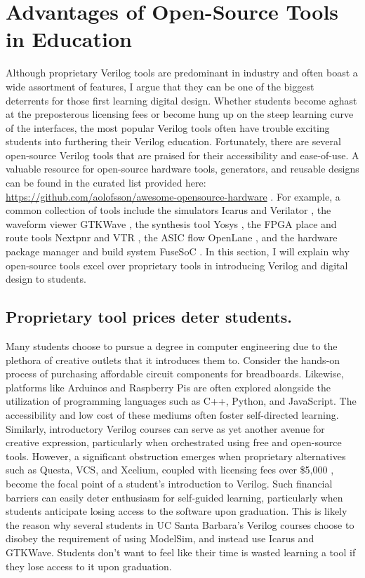 
\chapter{Advantages of Open-Source Tools in Education}
\label{chapter:open_source_tools}

Although proprietary Verilog tools are predominant in industry and often boast a wide assortment of features, I argue that they can be one of the biggest deterrents for those first learning digital design. Whether students become aghast at the preposterous licensing fees or become hung up on the steep learning curve of the interfaces, the most popular Verilog tools often have trouble exciting students into furthering their Verilog education. Fortunately, there are several open-source Verilog tools that are praised for their accessibility and ease-of-use. A valuable resource for open-source hardware tools, generators, and reusable designs can be found in the curated list provided here: \url{https://github.com/aolofsson/awesome-opensource-hardware} \cite{awesomeOpenSourceHardware}. For example, a common collection of tools include the simulators Icarus \cite{icarusGitHub} and Verilator \cite{verilatorGitHub}, the waveform viewer GTKWave \cite{gtkwaveGitHub}, the synthesis tool Yosys \cite{yosysGitHub}, the FPGA place and route tools Nextpnr \cite{nextpnrGitHub} and VTR \cite{vtrGitHub}, the ASIC flow OpenLane \cite{OpenLaneGitHub}, and the hardware package manager and build system FuseSoC \cite{fusesocGitHub, edalizeGitHub}. In this section, I will explain why open-source tools excel over proprietary tools in introducing Verilog and digital design to students.

\section{Proprietary tool prices deter students.}

Many students choose to pursue a degree in computer engineering due to the plethora of creative outlets that it introduces them to. Consider the hands-on process of purchasing affordable circuit components for breadboards. Likewise, platforms like Arduinos and Raspberry Pis are often explored alongside the utilization of programming languages such as C++, Python, and JavaScript. The accessibility and low cost of these mediums often foster self-directed learning. Similarly, introductory Verilog courses can serve as yet another avenue for creative expression, particularly when orchestrated using free and open-source tools. However, a significant obstruction emerges when proprietary alternatives such as Questa, VCS, and Xcelium, coupled with licensing fees over \$5,000 \cite{olofssonLatchUp, licensePricesReddit}, become the focal point of a student's introduction to Verilog. Such financial barriers can easily deter enthusiasm for self-guided learning, particularly when students anticipate losing access to the software upon graduation. This is likely the reason why several students in UC Santa Barbara's Verilog courses choose to disobey the requirement of using ModelSim, and instead use Icarus and GTKWave. Students don't want to feel like their time is wasted learning a tool if they lose access to it upon graduation.

